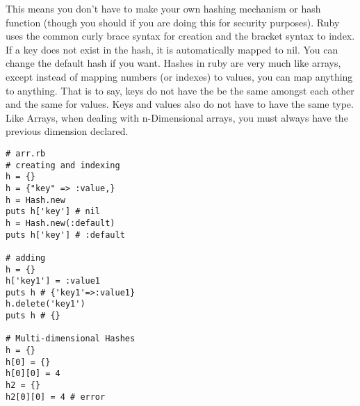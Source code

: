 \documentclass[main.tex]{subfiles}
\begin{document}
This means you don't have to make your own hashing mechanism or hash function (though you should if you are doing this for security purposes).
Ruby uses the common curly brace syntax for creation and the bracket syntax to index.
If a key does not exist in the hash, it is automatically mapped to nil.
You can change the default hash if you want.
Hashes in ruby are very much like arrays, except instead of mapping numbers (or indexes) to values, you can map anything to anything. 
That is to say, keys do not have the be the same amongst each other and the same for values. Keys and values also do not have to have the same type.
Like Arrays, when dealing with n-Dimensional arrays, you must always have the previous dimension declared.
\begin{lstlisting}[style=MyRubyStyle]
# arr.rb
# creating and indexing
h = {}
h = {"key" => :value,}
h = Hash.new
puts h['key'] # nil 
h = Hash.new(:default)
puts h['key'] # :default

# adding
h = {}
h['key1'] = :value1
puts h # {'key1'=>:value1}
h.delete('key1')
puts h # {}

# Multi-dimensional Hashes
h = {}
h[0] = {}
h[0][0] = 4
h2 = {}
h2[0][0] = 4 # error
\end{lstlisting}
\end{document}
